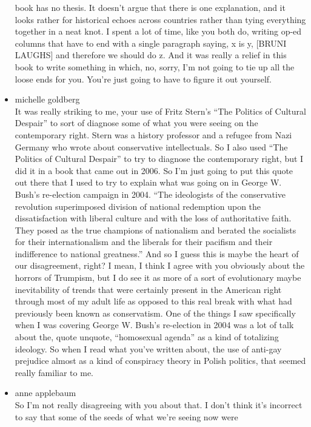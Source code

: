 \begin{itemize}
  book has no thesis. It doesn't argue that there is one explanation,
  and it looks rather for historical echoes across countries rather than
  tying everything together in a neat knot. I spent a lot of time, like
  you both do, writing op-ed columns that have to end with a single
  paragraph saying, x is y, {[}BRUNI LAUGHS{]} and therefore we should
  do z. And it was really a relief in this book to write something in
  which, no, sorry, I'm not going to tie up all the loose ends for you.
  You're just going to have to figure it out yourself.
\item
  michelle goldberg\\
  It was really striking to me, your use of Fritz Stern's ``The Politics
  of Cultural Despair'' to sort of diagnose some of what you were seeing
  on the contemporary right. Stern was a history professor and a refugee
  from Nazi Germany who wrote about conservative intellectuals. So I
  also used ``The Politics of Cultural Despair'' to try to diagnose the
  contemporary right, but I did it in a book that came out in 2006. So
  I'm just going to put this quote out there that I used to try to
  explain what was going on in George W. Bush's re-election campaign in
  2004. ``The ideologists of the conservative revolution superimposed
  division of national redemption upon the dissatisfaction with liberal
  culture and with the loss of authoritative faith. They posed as the
  true champions of nationalism and berated the socialists for their
  internationalism and the liberals for their pacifism and their
  indifference to national greatness.'' And so I guess this is maybe the
  heart of our disagreement, right? I mean, I think I agree with you
  obviously about the horrors of Trumpism, but I do see it as more of a
  sort of evolutionary maybe inevitability of trends that were certainly
  present in the American right through most of my adult life as opposed
  to this real break with what had previously been known as
  conservatism. One of the things I saw specifically when I was covering
  George W. Bush's re-election in 2004 was a lot of talk about the,
  quote unquote, ``homosexual agenda'' as a kind of totalizing ideology.
  So when I read what you've written about, the use of anti-gay
  prejudice almost as a kind of conspiracy theory in Polish politics,
  that seemed really familiar to me.
\item
  anne applebaum\\
  So I'm not really disagreeing with you about that. I don't think it's
  incorrect to say that some of the seeds of what we're seeing now were

\end{itemize}
